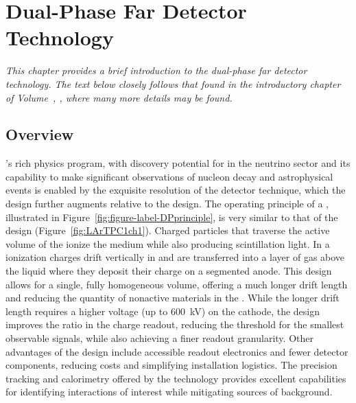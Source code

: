 \chapter{Dual-Phase Far Detector Technology}
\label{ch:exec-dp}

\textit{This chapter provides a brief introduction to the dual-phase far detector technology.  The text below closely follows that found in the introductory chapter of Volume~\volnumberdp{}, \voltitledp{}, where many more details may be found.}


\section{Overview}
\label{sec:dp-execsum-introduction}


's rich physics program, with discovery potential for  in the neutrino sector and its capability to make significant observations of nucleon decay and astrophysical events is enabled by the exquisite resolution of the  detector technique, which the  design further augments relative to the  design. 
The operating principle of a  , illustrated in Figure~\ref{fig:figure-label-DPprinciple}, is very similar to that of the  design (Figure~\ref{fig:LArTPC1ch1}).  Charged particles that traverse the active volume of the  ionize the medium while also producing scintillation light. 
In a  ionization charges drift vertically in  and are transferred
into a layer of gas above the liquid where they deposit their charge on a segmented anode. This design allows for a single, fully homogeneous  volume, offering a much longer drift length and reducing  the quantity of nonactive materials in the .
While the longer drift length requires a higher voltage (up to \SI{600}{kV}) on the cathode, the  design improves the  ratio in the charge readout, reducing the threshold for the smallest observable signals, while also achieving a finer readout granularity.  
Other advantages of the  design include accessible readout electronics and fewer detector components, reducing costs and simplifying installation logistics.
The precision tracking and calorimetry offered by the  technology provides excellent capabilities for identifying interactions of interest while mitigating sources of background.  

